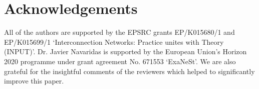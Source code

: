 \documentclass{article}
\begin{document}
\section*{Acknowledgements}

All of the authors are supported by the EPSRC grants EP/K015680/1 and EP/K015699/1 `Interconnection Networks: Practice unites with Theory (INPUT)'. Dr. Javier Navaridas is supported by the European Union's Horizon 2020 programme under grant agreement No. 671553 `ExaNeSt'. We are also grateful for the insightful comments of the reviewers which helped to significantly improve this paper.
\end{document}
